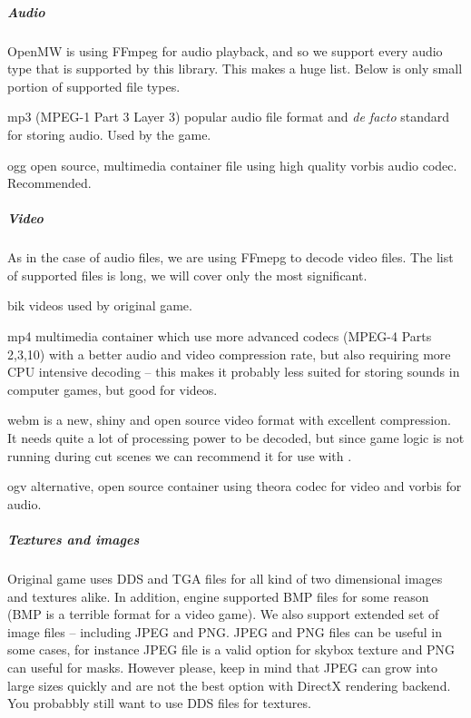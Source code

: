 \subparagraph{Audio}
OpenMW is using {FFmpeg} for audio playback, and so we support every audio type that is supported by this library. This makes a huge list.
Below is only small portion of supported file types.

\begin{description}
 \item mp3 ({MPEG}-1 {Part 3 Layer 3}) popular audio file format and \textit{de facto} standard for storing audio. Used by the \MW{} game.
 \item ogg open source, multimedia container file using high quality vorbis audio codec. Recommended.
\end{description}

\subparagraph{Video}
As in the case of audio files, we are using {FFmepg} to decode video files. The list of supported files is long, we will cover
only the most significant.

\begin{description}
 \item bik videos used by original \MW{} game.
 \item mp4 multimedia container which use more advanced codecs ({MPEG-4 Parts 2,3,10}) with a better audio and video compression rate,
 but also requiring more {CPU} intensive decoding -- this makes it probably less suited for storing sounds in computer games, but good for videos.
 \item webm is a new, shiny and open source video format with excellent compression. It needs quite a lot of processing power to be decoded,
 but since game logic is not running during cut scenes we can recommend it for use with \OMW.
 \item ogv alternative, open source container using theora codec for video and vorbis for audio.
\end{description}

\subparagraph{Textures and images}
Original \MW{} game uses {DDS} and {TGA} files for all kind of two dimensional images and textures alike. In addition, engine supported BMP
files for some reason ({BMP} is a terrible format for a video game). We also support extended set of image files -- including {JPEG} and {PNG}.
JPEG and PNG files can be useful in some cases, for instance JPEG file is a valid option for skybox texture and PNG can useful for masks.
However please, keep in mind that JPEG can grow into large sizes quickly and are not the best option with {DirectX} rendering backend. You probabbly still want 
to use {DDS} files for textures.

